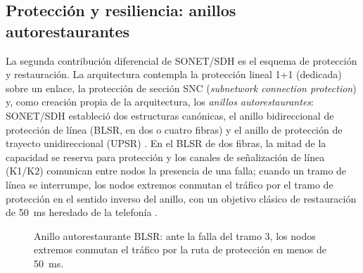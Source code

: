 \documentclass[12pt,a4paper]{article}
\begin{document}
\subsection{Protección y resiliencia: anillos autorestaurantes}

La segunda contribución diferencial de SONET/SDH es el esquema de protección y restauración. La arquitectura contempla la protección lineal 1+1 (dedicada) sobre un enlace, la protección de sección SNC (\emph{subnetwork connection protection}) y, como creación propia de la arquitectura, los \emph{anillos autorestaurantes}: SONET/SDH estableció dos estructuras canónicas, el anillo bidireccional de protección de línea (BLSR, en dos o cuatro fibras) y el anillo de protección de trayecto unidireccional (UPSR) \cite{ansi, stallings2004}. En el BLSR de dos fibras, la mitad de la capacidad se reserva para protección y los canales de señalización de línea (K1/K2) comunican entre nodos la presencia de una falla; cuando un tramo de línea se interrumpe, los nodos extremos conmutan el tráfico por el tramo de protección en el sentido inverso del anillo, con un objetivo clásico de restauración de 50~ms heredado de la telefonía \cite{ansi, ituG823}.

\begin{figure}[h]
    \centering
    \caption{Anillo autorestaurante BLSR: ante la falla del tramo 3, los nodos extremos conmutan el tráfico por la ruta de protección en menos de 50~ms.}
    \label{fig:anillo}
\end{figure}
\end{document}
